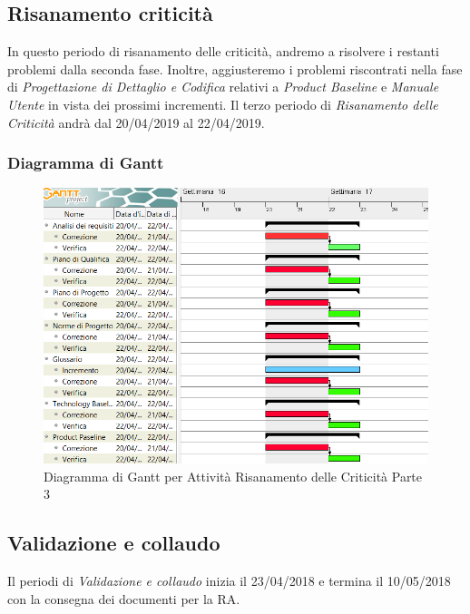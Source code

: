 \subsection{Risanamento criticità}
In questo periodo di risanamento delle criticità, andremo a risolvere i restanti problemi dalla seconda fase. Inoltre, aggiusteremo i problemi riscontrati nella fase di \textit{Progettazione di Dettaglio e Codifica} relativi a \textit{Product Baseline} e \textit{Manuale Utente} in vista dei prossimi incrementi.
Il terzo periodo di \textit{Risanamento delle Criticità} andrà dal 20/04/2019 al 22/04/2019.

\subsubsection{Diagramma di Gantt}
\begin{figure}[h]
	\centering
  		\includegraphics[width=1.0\linewidth]{./images/RisanamentoCriticita3.png}
  		\caption{Diagramma di Gantt per Attività Risanamento delle Criticità Parte 3}
  		\label{fig:Gantt Risananmento Criticità 3}
\end{figure}

\subsection{Validazione e collaudo}
Il periodi di \textit{Validazione e collaudo} inizia il 23/04/2018 e termina il 10/05/2018 con la consegna dei documenti per la RA. 

